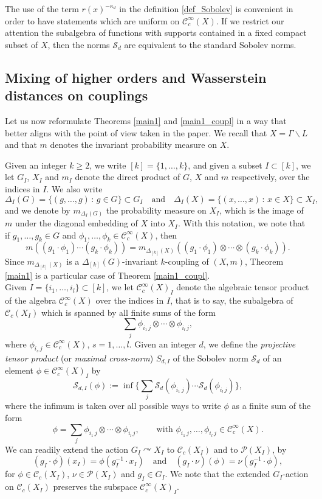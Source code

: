 \documentclass[11pt,reqno,a4paper]{amsart}
\numberwithin{equation}{section}
\newcommand{\cC}{\mathcal{C}}
\newcommand{\cP}{\mathcal{P}}
\newcommand{\cS}{\mathcal{S}}
\newcommand{\qand}{\quad \textrm{and} \quad}
\def\acts{\curvearrowright}
\theoremstyle{theorem}
\theoremstyle{definition}
\begin{document}
The use of the term $r(x)^{-\kappa_d}$ in the definition \eqref{def_Sobolev}
is convenient in order to have statements which are uniform
on $\cC_c^\infty(X)$. If we restrict our attention 
the subalgebra of functions with
supports contained in a fixed compact subset of $X$,
then the norms $\cS_d$ are 
equivalent to the 
standard Sobolev norms.

\subsection{Mixing of higher orders and Wasserstein distances on couplings}

Let us now reformulate Theorems \ref{main1} and \ref{main1_coupl} in a way that better aligns
with the point of view taken  in the paper. We recall that 
$X = \Gamma \backslash L$ and that $m$ denotes the invariant probability measure on $X$. 

Given an integer $k \geq 2$, we write
$[k] = \{1,\ldots,k\}$, and given a subset $I \subset [k]$, we let $G_I$, $X_I$ and $m_I$ 
denote the direct product of $G$, $X$ and $m$ respectively, over the indices in $I$. We 
also write
\[
\Delta_I(G) = \{ (g,\ldots,g) \, : \, g \in G \} \subset G_I
\qand
\Delta_I(X) = \{ (x,\ldots,x) \, : \, x \in X \} \subset X_I,
\]
and we denote by $m_{\Delta_I(G)}$ the probability measure on $X_{I}$, which is the image of $m$ 
under the diagonal embedding of $X$ into $X_{I}$. 
With this notation, we note that if $g_1,\ldots,g_k \in G$ and $\phi_1,\ldots,\phi_k \in\cC^\infty_c(X)$, then
\[
m((g_1 \cdot \phi_1) \cdots (g_k \cdot \phi_k))
=
m_{\Delta_{[k]}(X)}((g_1\cdot \phi_1)\otimes\cdots \otimes (g_k\cdot \phi_k)).
\]
Since $m_{\Delta_{[k]}(X)}$ is a $\Delta_{[k]}(G)$-invariant $k$-coupling of $(X,m)$, Theorem \ref{main1} is a particular case of 
Theorem \ref{main1_coupl}.
 \\

Given $I = \{i_1,\ldots,i_l\} \subset [k]$, we let $\cC^\infty_c(X)_I$ denote 
the algebraic tensor product of the algebra $\cC^\infty_c(X)$ over the indices in $I$, that is to say, the subalgebra of 
$\cC_c(X_I)$ which is spanned by all finite sums of the form
\[
\sum_{j} \phi_{i_1\,j} \otimes \cdots \otimes \phi_{i_l\,j},
\]
where $\phi_{i_s\,j} \in \cC^\infty_c(X)$, $s = 1,\ldots,l$. Given an integer $d$, we define the \emph{projective tensor product} (or \emph{maximal cross-norm}) $S_{d,I}$ of the Sobolev norm $\cS_d$ of an element $\phi \in\cC_c^\infty(X)_I$ by
\[
\cS_{d,I}(\phi) := \inf\Big\{ \sum_{j} \cS_d(\phi_{i_1\,j}) \cdots \cS_d(\phi_{i_l\,j}) \Big\},
\]
where the infimum is taken over all possible ways to write $\phi$ as a finite sum of the form
\[
\phi = \sum_j \phi_{i_1\,j} \otimes \cdots \otimes \phi_{i_l\,j}, \quad\quad \textrm{with $\phi_{i_1\,j},\ldots,\phi_{i_l\,j} \in\cC_c^\infty(X)$}.
\]
We can readily extend the action $G_I \acts X_I$ to $\cC_c(X_I)$ and to $\cP(X_I)$, by 
\[
(g_I \cdot \phi)(x_I) = \phi(g_I^{-1} \cdot x_I) \qand (g_I \cdot \nu)(\phi) = \nu(g_I^{-1} \cdot \phi),
\]
for $\phi \in\cC_c(X_I)$, $\nu \in \cP(X_I)$ and $g_I \in G_I$. We note that the extended $G_I$-action on $\cC_c(X_I)$ preserves the subspace $\cC_c^\infty(X)_I$.\\
\end{document}
